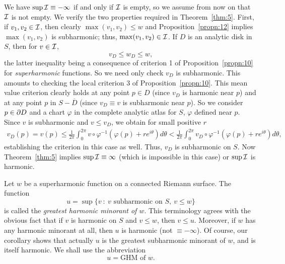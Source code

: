\documentclass[a4paper,11pt]{article}
\begin{document}
\begin{myproof}
  We have $\sup {\mathcal{I}} \equiv -\infty$ if and only if ${\mathcal{I}}$ is empty,
  so we assume from now on that ${\mathcal{I}}$ is not empty.  We verify the
  two properties required in Theorem~\ref{thm:5}.  First, if $v_1, v_2
  \in {\mathcal{I}}$, then clearly $\max(v_1, v_2) \le w$ and
  Proposition~\ref{propn:12} implies $\max(v_1, v_2)$ is subharmonic;
  thus, $\max(v_1, v_2) \in {\mathcal{I}}$.  If $D$ is an analytic disk in
  $S$, then for $v \in {\mathcal{I}}$,
  $$
  v_D \le w_D \le w,
  $$
  the latter inequality being a consequence of criterion 1 of
  Proposition~\ref{propn:10} for \emph{superharmonic} functions.  So
  we need only check $v_D$ is subharmonic.  This amounts to checking
  the local criterion 3 of Proposition~\ref{propn:10}.  This mean
  value criterion clearly holds at any point $p \in D$ (since $v_D$ is
  harmonic near $p$) and at any point $p$ in $S - \overline{D}$ (since
  $v_D \equiv v$ is subharmonic near $p$).  So we consider $p \in \partial
  D$ and a chart $\varphi$ in the complete analytic atlas for $S$,
  $\varphi$ defined near $p$.  Since $v$ is subharmonic and $v \le
  v_D$, we obtain for small positive $r$
  $$
  \begin{aligned}
    v_D(p) = v(p) \le \frac{1}{2\pi} \int_0^{2\pi} v \circ
    \varphi^{-1}(\varphi(p) + re^{i\theta}) d\theta
    < \frac{1}{2\pi} \int_0^{2\pi} v_D \circ \varphi^{-1}(\varphi(p)
    + re^{i\theta}) d\theta,
  \end{aligned}
  $$
  establishing the criterion in this case as well.  Thus, $v_D$ is
  subharmonic on $S$.  Now Theorem~\ref{thm:5} implies $\sup {\mathcal{I}}
  \equiv \infty$ (which is impossible in this case) or $\sup {\mathcal{I}}$ is
  harmonic.
\end{myproof}

\begin{defn}
  \label{def:5}
  Let $w$ be a superharmonic function on a connected Riemann surface.
  The function
  $$
  u = \sup\{ v ~:~ v \text{ subharmonic on } S,\ v \le w\}
  $$
  is called the \emph{greatest harmonic minorant of $w$}.  This
  terminology agrees with the obvious fact that if $v$ is harmonic on
  $S$ and $v \le w$, then $v \le u$.  Moreover, if $w$ has any
  harmonic minorant at all, then $u$ is harmonic (not $\equiv
  -\infty$).  Of course, our corollary shows that actually $u$ is the
  greatest subharmonic minorant of $w$, and is itself harmonic.  We
  shall use the abbreviation
  $$
  u = \text{GHM of }w.
  $$
\end{defn}
\end{document}
